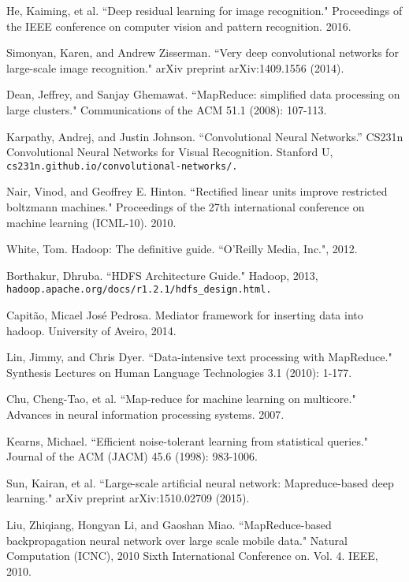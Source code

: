 \documentclass[12pt]{report}
\begin{document}
\begin{thebibliography}{}
He, Kaiming, et al. ``Deep residual learning for image recognition." Proceedings of the IEEE conference on computer vision and pattern recognition. 2016.

Simonyan, Karen, and Andrew Zisserman. ``Very deep convolutional networks for large-scale image recognition." arXiv preprint arXiv:1409.1556 (2014).

Dean, Jeffrey, and Sanjay Ghemawat. ``MapReduce: simplified data processing on large clusters." Communications of the ACM 51.1 (2008): 107-113.

Karpathy, Andrej, and Justin Johnson. ``Convolutional Neural Networks.” CS231n Convolutional Neural Networks for Visual Recognition. Stanford U, \\\texttt{cs231n.github.io/convolutional-networks/.}


Nair, Vinod, and Geoffrey E. Hinton. ``Rectified linear units improve restricted boltzmann machines." Proceedings of the 27th international conference on machine learning (ICML-10). 2010.

White, Tom. Hadoop: The definitive guide. ``O'Reilly Media, Inc.", 2012.

Borthakur, Dhruba. ``HDFS Architecture Guide." Hadoop, 2013, \\\texttt{hadoop.apache.org/docs/r1.2.1/hdfs\_design.html.}

Capitão, Micael José Pedrosa. Mediator framework for inserting data into hadoop.  University of Aveiro, 2014.

Lin, Jimmy, and Chris Dyer. ``Data-intensive text processing with MapReduce." Synthesis Lectures on Human Language Technologies 3.1 (2010): 1-177.


Chu, Cheng-Tao, et al. ``Map-reduce for machine learning on multicore." Advances in neural information processing systems. 2007.


Kearns, Michael. ``Efficient noise-tolerant learning from statistical queries." Journal of the ACM (JACM) 45.6 (1998): 983-1006.

Sun, Kairan, et al. ``Large-scale artificial neural network: Mapreduce-based deep learning." arXiv preprint arXiv:1510.02709 (2015).

Liu, Zhiqiang, Hongyan Li, and Gaoshan Miao. ``MapReduce-based backpropagation neural network over large scale mobile data." Natural Computation (ICNC), 2010 Sixth International Conference on. Vol. 4. IEEE, 2010.



\end{thebibliography}
\end{document}
